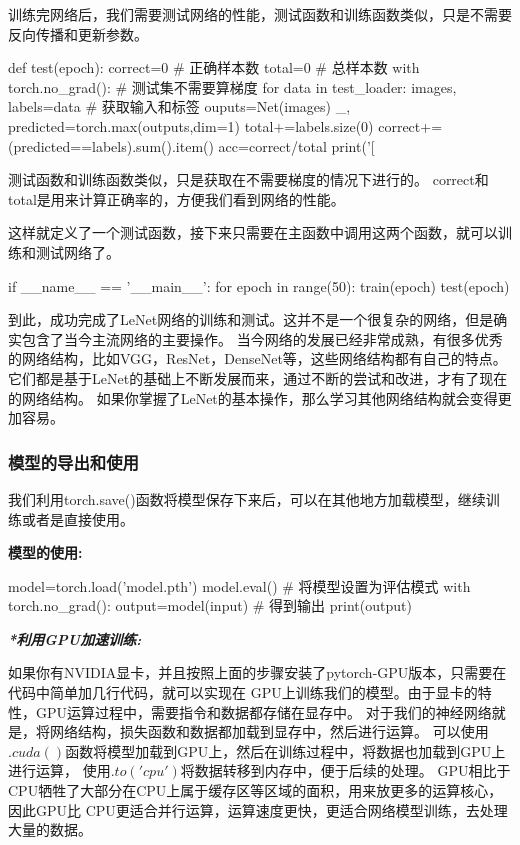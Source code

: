 训练完网络后，我们需要测试网络的性能，测试函数和训练函数类似，只是不需要反向传播和更新参数。
\begin{tpython}
    def test(epoch):
        correct=0 # 正确样本数
        total=0 # 总样本数
        with torch.no_grad(): # 测试集不需要算梯度
            for data in test_loader:
                images, labels=data # 获取输入和标签
                ouputs=Net(images)
                _, predicted=torch.max(outputs,dim=1)
                total+=labels.size(0)
                correct+=(predicted==labels).sum().item()
        acc=correct/total
        print('[%
\end{tpython}
测试函数和训练函数类似，只是获取在不需要梯度的情况下进行的。
correct和total是用来计算正确率的，方便我们看到网络的性能。

这样就定义了一个测试函数，接下来只需要在主函数中调用这两个函数，就可以训练和测试网络了。
\begin{tpython}
    if __name__ == '__main__':
        for epoch in range(50):
            train(epoch)
            test(epoch)
\end{tpython}

到此，成功完成了LeNet网络的训练和测试。这并不是一个很复杂的网络，但是确实包含了当今主流网络的主要操作。
当今网络的发展已经非常成熟，有很多优秀的网络结构，比如VGG，ResNet，DenseNet等，这些网络结构都有自己的特点。
它们都是基于LeNet的基础上不断发展而来，通过不断的尝试和改进，才有了现在的网络结构。
如果你掌握了LeNet的基本操作，那么学习其他网络结构就会变得更加容易。

\subsubsection{模型的导出和使用}
我们利用torch.save()函数将模型保存下来后，可以在其他地方加载模型，继续训练或者是直接使用。

\textbf{模型的使用:}
\begin{tpython}
    model=torch.load('model.pth')
    model.eval() # 将模型设置为评估模式
    with torch.no_grad():
        output=model(input) # 得到输出
        print(output)
\end{tpython}

\textbf{\textit{*利用GPU加速训练:}}

如果你有NVIDIA显卡，并且按照上面的步骤安装了pytorch-GPU版本，只需要在代码中简单加几行代码，就可以实现在
GPU上训练我们的模型。由于显卡的特性，GPU运算过程中，需要指令和数据都存储在显存中。
对于我们的神经网络就是，将网络结构，损失函数和数据都加载到显存中，然后进行运算。
可以使用$.cuda()$函数将模型加载到GPU上，然后在训练过程中，将数据也加载到GPU上进行运算，
使用$.to('cpu')$将数据转移到内存中，便于后续的处理。
GPU相比于CPU牺牲了大部分在CPU上属于缓存区等区域的面积，用来放更多的运算核心，因此GPU比
CPU更适合并行运算，运算速度更快，更适合网络模型训练，去处理大量的数据。

